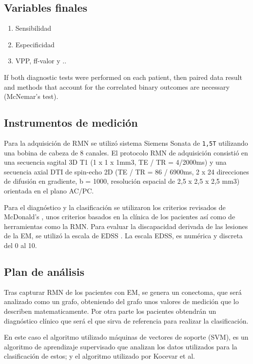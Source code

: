 \documentclass[fleqn,10pt]{UICArticle} %
\begin{document}
\subsection{Variables finales}


\begin{enumerate}[noitemsep]
\item Sensibilidad
\item Especificidad
\item VPP, ff-valor y ..
\end{enumerate}

If both diagnostic tests were performed on each patient, then paired data result and methods that account for the correlated binary outcomes are necessary (McNemar's test).



\subsection{Instrumentos de medición}
Para la adquisición de RMN se utilizó sistema Siemens Sonata de {\tt 1,5T} utilizando una bobina de cabeza de 8 canales. El protocolo RMN de adquisición consistió en una secuencia sagital 3D T1 (1 x 1 x 1mm3, TE / TR = 4/2000ms) y una secuencia axial DTI de spin-echo 2D (TE / TR = 86 / 6900ms, 2 x 24 direcciones de difusión en gradiente, b = 1000, resolución espacial de 2,5 x 2,5 x 2,5 mm3) orientada en el plano AC/PC.

Para el diagnóstico y la clasificación se utilizaron los criterios revisados de McDonald's \cite{Polman2011}, unos criterios basados en la clínica de los pacientes así como de herramientas como la RMN. Para evaluar la discapacidad derivada de las lesiones de la EM, se utilizó la escala de EDSS \cite{Kurtzke1983}. La escala EDSS, es numérica y discreta del 0 al 10.

\subsection{Plan de análisis}

Tras capturar RMN de los pacientes con EM, se genera un conectoma, que será analizado como un grafo, obteniendo del grafo unos valores de medición que lo describen matematicamente. Por otra parte los pacientes obtendrán un diagnóstico clínico que será el que sirva de referencia para realizar la clasificación.

En este caso el algoritmo utilizado máquinas de vectores de soporte (SVM), es un algoritmo de aprendizaje supervisado que analizan los datos utilizados para la clasificación de estos; y el algoritmo utilizado por Kocevar et al.\cite{Kocevar2016}
\end{document}
